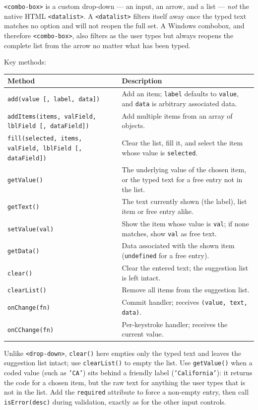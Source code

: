 \begin{notebox}
\texttt{<combo-box>} is a custom drop-down --- an input, an arrow, and a list --- \emph{not} the native HTML \texttt{<datalist>}.  A \texttt{<datalist>} filters itself away once the typed text matches no option and will not reopen the full set.  A Windows combobox, and therefore \texttt{<combo-box>}, also filters as the user types but always reopens the complete list from the arrow no matter what has been typed.
\end{notebox}

\noindent
Key methods:

\begin{longtable}{P{4.8cm}P{5.7cm}}
\toprule
\textbf{Method} & \textbf{Description} \\
\midrule
\endhead
\texttt{add(value [, label, data])} & Add an item; \texttt{label} defaults to \texttt{value}, and \texttt{data} is arbitrary associated data. \\
\texttt{addItems(items, valField, lblField [, dataField])} & Add multiple items from an array of objects. \\
\texttt{fill(selected, items, valField, lblField [, dataField])} & Clear the list, fill it, and select the item whose value is \texttt{selected}. \\
\texttt{getValue()} & The underlying value of the chosen item, or the typed text for a free entry not in the list. \\
\texttt{getText()} & The text currently shown (the label), list item or free entry alike. \\
\texttt{setValue(val)} & Show the item whose value is \texttt{val}; if none matches, show \texttt{val} as free text. \\
\texttt{getData()} & Data associated with the shown item (\texttt{undefined} for a free entry). \\
\texttt{clear()} & Clear the entered text; the suggestion list is left intact. \\
\texttt{clearList()} & Remove all items from the suggestion list. \\
\texttt{onChange(fn)} & Commit handler; receives \texttt{(value, text, data)}. \\
\texttt{onCChange(fn)} & Per-keystroke handler; receives the current value. \\
\bottomrule
\end{longtable}

\begin{tipbox}
Unlike \texttt{<drop-down>}, \texttt{clear()} here empties only the typed text and leaves the suggestion list intact; use \texttt{clearList()} to empty the list.  Use \texttt{getValue()} when a coded value (such as \texttt{'CA'}) sits behind a friendly label (\texttt{'California'}): it returns the code for a chosen item, but the raw text for anything the user types that is not in the list.  Add the \texttt{required} attribute to force a non-empty entry, then call \texttt{isError(desc)} during validation, exactly as for the other input controls.
\end{tipbox}

